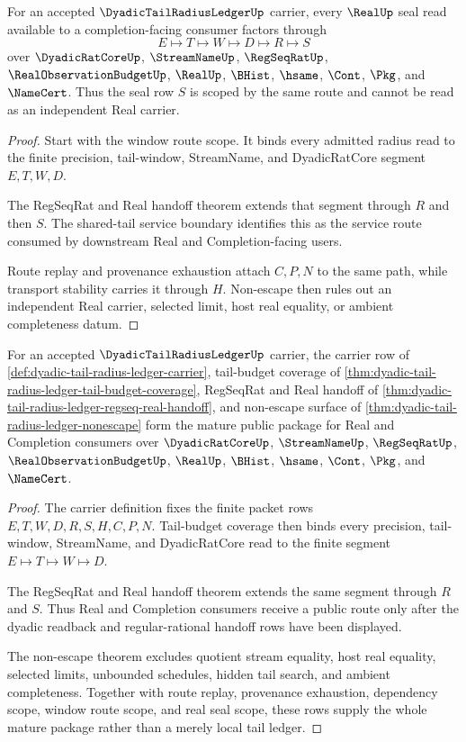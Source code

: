 \begin{theorem}
\label{thm:dyadic-tail-radius-ledger-real-seal-scope}
For an accepted $\DyadicTailRadiusLedgerUp$ carrier, every $\RealUp$ seal read available to a completion-facing consumer factors through
$$
E \longmapsto T \longmapsto W \longmapsto D \longmapsto R \longmapsto S
$$
over $\DyadicRatCoreUp$, $\StreamNameUp$, $\RegSeqRatUp$, $\RealObservationBudgetUp$, $\RealUp$, $\BHist$, $\hsame$, $\Cont$, $\Pkg$, and $\NameCert$. Thus the seal row $S$ is scoped by the same route and cannot be read as an independent Real carrier.
\end{theorem}
\begin{proof}
Start with the window route scope. It binds every admitted radius read to the finite precision, tail-window, StreamName, and DyadicRatCore segment $E,T,W,D$.

The RegSeqRat and Real handoff theorem extends that segment through $R$ and then $S$. The shared-tail service boundary identifies this as the service route consumed by downstream Real and Completion-facing users.

Route replay and provenance exhaustion attach $C,P,N$ to the same path, while transport stability carries it through $H$. Non-escape then rules out an independent Real carrier, selected limit, host real equality, or ambient completeness datum.
\end{proof}

\begin{theorem}
\label{thm:dyadic-tail-radius-ledger-mature-consumer-package}
For an accepted $\DyadicTailRadiusLedgerUp$ carrier, the carrier row of \autoref{def:dyadic-tail-radius-ledger-carrier}, tail-budget coverage of \autoref{thm:dyadic-tail-radius-ledger-tail-budget-coverage}, RegSeqRat and Real handoff of \autoref{thm:dyadic-tail-radius-ledger-regseq-real-handoff}, and non-escape surface of \autoref{thm:dyadic-tail-radius-ledger-nonescape} form the mature public package for Real and Completion consumers over $\DyadicRatCoreUp$, $\StreamNameUp$, $\RegSeqRatUp$, $\RealObservationBudgetUp$, $\RealUp$, $\BHist$, $\hsame$, $\Cont$, $\Pkg$, and $\NameCert$.
\end{theorem}
\begin{proof}
The carrier definition fixes the finite packet rows $E,T,W,D,R,S,H,C,P,N$. Tail-budget coverage then binds every precision, tail-window, StreamName, and DyadicRatCore read to the finite segment $E \longmapsto T \longmapsto W \longmapsto D$.

The RegSeqRat and Real handoff theorem extends the same segment through $R$ and $S$. Thus Real and Completion consumers receive a public route only after the dyadic readback and regular-rational handoff rows have been displayed.

The non-escape theorem excludes quotient stream equality, host real equality, selected limits, unbounded schedules, hidden tail search, and ambient completeness. Together with route replay, provenance exhaustion, dependency scope, window route scope, and real seal scope, these rows supply the whole mature package rather than a merely local tail ledger.
\end{proof}

